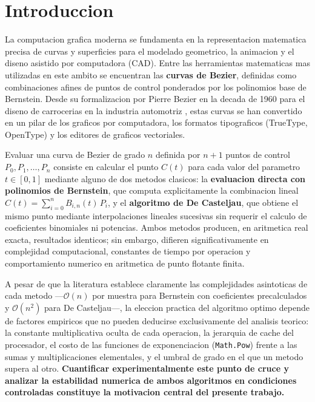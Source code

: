 \section{Introduccion}
\label{sec:introduccion}

La computacion grafica moderna se fundamenta en la representacion matematica precisa de curvas y superficies para el modelado geometrico, la animacion y el diseno asistido por computadora (CAD). Entre las herramientas matematicas mas utilizadas en este ambito se encuentran las \textbf{curvas de Bezier}, definidas como combinaciones afines de puntos de control ponderados por los polinomios base de Bernstein. Desde su formalizacion por Pierre Bezier en la decada de 1960 para el diseno de carrocerias en la industria automotriz \cite{farin2002}, estas curvas se han convertido en un pilar de los graficos por computadora, los formatos tipograficos (TrueType, OpenType) y los editores de graficos vectoriales.

Evaluar una curva de Bezier de grado $n$ definida por $n + 1$ puntos de control $P_0, P_1, \dots, P_n$ consiste en calcular el punto $C(t)$ para cada valor del parametro $t \in [0, 1]$ mediante alguno de dos metodos clasicos: la \textbf{evaluacion directa con polinomios de Bernstein}, que computa explicitamente la combinacion lineal $C(t) = \sum_{i=0}^{n} B_{i,n}(t) \, P_i$, y el \textbf{algoritmo de De Casteljau}, que obtiene el mismo punto mediante interpolaciones lineales sucesivas sin requerir el calculo de coeficientes binomiales ni potencias. Ambos metodos producen, en aritmetica real exacta, resultados identicos; sin embargo, difieren significativamente en complejidad computacional, constantes de tiempo por operacion y comportamiento numerico en aritmetica de punto flotante finita.

A pesar de que la literatura establece claramente las complejidades asintoticas de cada metodo ---$\mathcal{O}(n)$ por muestra para Bernstein con coeficientes precalculados y $\mathcal{O}(n^2)$ para De Casteljau---, la eleccion practica del algoritmo optimo depende de factores empiricos que no pueden deducirse exclusivamente del analisis teorico: la constante multiplicativa oculta de cada operacion, la jerarquia de cache del procesador, el costo de las funciones de exponenciacion (\texttt{Math.Pow}) frente a las sumas y multiplicaciones elementales, y el umbral de grado en el que un metodo supera al otro. \textbf{Cuantificar experimentalmente este punto de cruce y analizar la estabilidad numerica de ambos algoritmos en condiciones controladas constituye la motivacion central del presente trabajo.}

